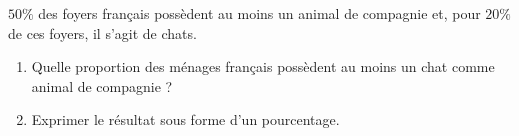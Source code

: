 \begin{exo}{}
	$50\%$ des foyers français possèdent au moins un animal de compagnie et, pour $20\%$ de ces foyers, il s'agit de chats.
	\begin{enumerate}
		\item Quelle proportion des ménages français possèdent au moins un chat comme animal de compagnie ?
		\item Exprimer le résultat sous forme d'un pourcentage.
	\end{enumerate}
\end{exo}
